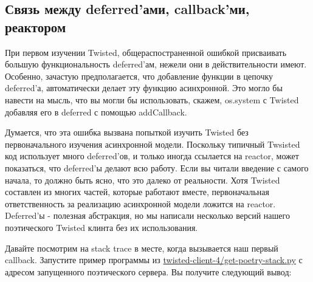 \subsection{Связь между deferred'ами, callback'ми, реактором}


При первом изучении Twisted, общераспостраненной ошибкой 
присваивать большую функциональность deferred'ам, нежели 
они в действительности имеют. Особенно, зачастую предполагается, 
что добавление функции в цепочку deferred'а, автоматически 
делает эту функцию асинхронной. Это могло бы навести на мысль, 
что вы могли бы использовать, скажем, os.system с Twisted 
добавляя его в deferred с помощью addCallback.


Думается, что эта ошибка вызвана попыткой изучить 
Twisted без первоначального изучения асинхронной модели. 
Поскольку типичный Twsisted код использует много deferred'ов, 
и только иногда ссылается на reactor, может показаться, что 
deferred'ы делают всю работу. Если вы читали введение с 
самого начала, то должно быть ясно, что это далеко от реальности. 
Хотя Twisted составлен из многих частей, которые работают вместе, 
первоначальная ответственность за реализацию асинхронной 
модели ложится на reactor. Deferred'ы - полезная абстракция, но 
мы написали несколько версий нашего поэтического Twisted 
клинта без их использования.


Давайте посмотрим на stack trace в месте, когда вызывается 
наш первый callback. Запустите пример программы из 
\href{http://github.com/jdavisp3/twisted-intro/blob/master/twisted-client-4/get-poetry-stack.py}{twisted-client-4/get-poetry-stack.py} с адресом запущенного поэтического сервера. 
Вы получите следующий вывод:

